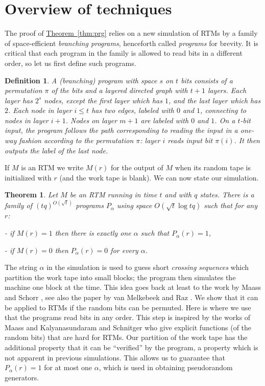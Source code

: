 \documentclass[11pt]{article}
\numberwithin{equation}{section}
\theoremstyle{definition}
\theoremstyle{plain}
\newcommand{\expref}[2]{\hyperref[#2]{#1~\ref{#2}}}
\newtheorem{thm}[theorem]{Theorem}
\newtheorem{defn}[theorem]{Definition}
\begin{document}
\section{Overview of techniques \label{sec:Overview-of-techniques}}

The proof of \expref{Theorem}{thm:prg} relies on a new simulation of
RTMs by a family of space-efficient \emph{branching programs}, henceforth
called \emph{programs} for brevity. It is critical that each program
in the family is allowed to read bits in a different order, so let
us first define such programs.
\begin{defn}
A \emph{(branching) program }with space $s$ on $t$ bits consists
of a permutation $\pi$ of the bits and a layered directed graph with
$t+1$ layers. Each layer has $2^{s}$ nodes, except the first layer
which has $1$, and the last layer which has $2$. Each node in layer
$i\le t$ has two edges, labeled with $0$ and $1$, connecting to
nodes in layer $i+1$. Nodes on layer $m+1$ are labeled with $0$
and $1$. On a $t$-bit input, the program follows the path corresponding
to reading the input in a one-way fashion according to the permutation
$\pi$: layer $i$ reads input bit $\pi(i)$. It then outputs the
label of the last node.
\end{defn}

If $M$ is an RTM we write $M(r)$ for the output of $M$ when its
random tape is initialized with $r$ (and the work tape is blank).
We can now state our simulation.
\begin{thm}
\label{thm:M-to-OR-BP}Let $M$ be an RTM running in time $t$ and
with $q$ states. There is a family of $(tq)^{O(\sqrt{t})}$ programs
$P_{\alpha}$ using space $O(\sqrt{t}\log tq)$ such that for any
$r$:

- if $M(r)=1$ then there is exactly one $\alpha$ such that $P_{\alpha}(r)=1$,

- if $M(r)=0$ then $P_{\alpha}(r)=0$ for every $\alpha$.
\end{thm}

The string $\alpha$ in the simulation is used to guess short \emph{crossing
sequences} which partition the work tape into small blocks; the program
then simulates the machine one block at the time. This idea goes back
at least to the work by Maass and Schorr \cite{MaS87}, see also the
paper by van Melkebeek and Raz \cite{DBLP:journals/tcs/MelkebeekR05}.
We show that it can be applied to RTMs if the random bits can be permuted.
Here is where we use that the programs read bits in any order. This
step is inspired by the works of Maass \cite{MR808746} and Kalyanasundaram
and Schnitger \cite{KalyanasundaramS92} who give explicit functions
(of the random bits) that are hard for RTMs. Our partition of the
work tape has the additional property that it can be ``verified''
by the program, a property which is not apparent in previous simulations.
This allows us to guarantee that $P_{\alpha}(r)=1$ for at most one
$\alpha$, which is used in obtaining pseudorandom generators.
\end{document}
